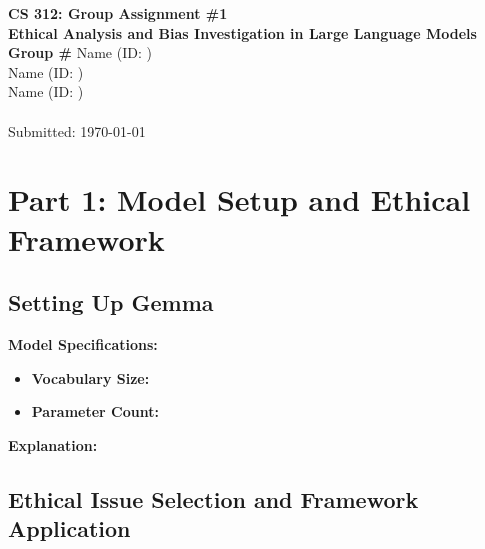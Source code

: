 \documentclass[11pt]{article}
\begin{document}
\begin{center}
\Large{\textbf{CS 312: Group Assignment \#1}}\\
\large{\textbf{Ethical Analysis and Bias Investigation in Large Language Models}}\\
\vspace{1cm}
\normalsize{\textbf{Group \#}} %
\vspace{0.5cm}
\normalsize{
Name (ID: )\\
Name (ID: )\\
Name (ID: )\\
}\\
\vspace{0.5cm}
\normalsize{Submitted: \today}
\end{center}

\vspace{1cm}

\section{Part 1: Model Setup and Ethical Framework}

\subsection{Setting Up Gemma}


\textbf{Model Specifications:}
\begin{itemize}
    \item \textbf{Vocabulary Size:} %
    \item \textbf{Parameter Count:} %
\end{itemize}

\textbf{Explanation:}


\subsection{Ethical Issue Selection and Framework Application}
\end{document}
